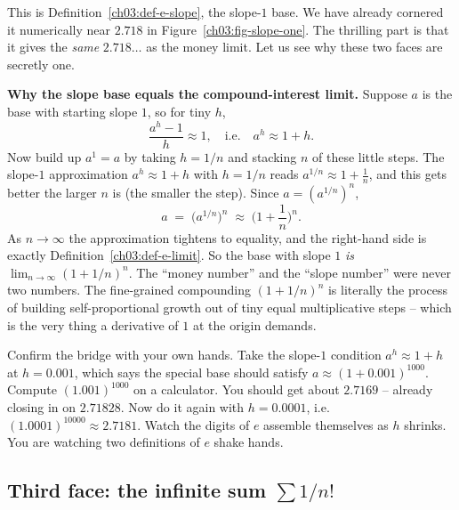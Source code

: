 This is Definition~\ref{ch03:def-e-slope}, the slope-$1$ base. We have already cornered it numerically near $2.718$ in Figure~\ref{ch03:fig-slope-one}. The thrilling part is that it gives the \emph{same} $2.718\ldots$ as the money limit. Let us see why these two faces are secretly one.

\begin{whybox}
\textbf{Why the slope base equals the compound-interest limit.} Suppose $a$ is the base with starting slope $1$, so for tiny $h$,
\[
\frac{a^{h}-1}{h}\approx 1, \quad\text{i.e.}\quad a^{h}\approx 1+h .
\]
Now build up $a^1=a$ by taking $h=1/n$ and stacking $n$ of these little steps. The slope-$1$ approximation $a^{h}\approx 1+h$ with $h=1/n$ reads $a^{1/n}\approx 1+\tfrac1n$, and this gets better the larger $n$ is (the smaller the step). Since $a = (a^{1/n})^n$,
\[
a \;=\; \big(a^{1/n}\big)^{n} \;\approx\; \Big(1+\frac1n\Big)^{n}.
\]
As $n\to\infty$ the approximation tightens to equality, and the right-hand side is exactly Definition~\ref{ch03:def-e-limit}. So the base with slope $1$ \emph{is} $\lim_{n\to\infty}(1+1/n)^n$. The ``money number'' and the ``slope number'' were never two numbers. The fine-grained compounding $(1+1/n)^n$ is literally the process of building self-proportional growth out of tiny equal multiplicative steps -- which is the very thing a derivative of $1$ at the origin demands.
\end{whybox}

\begin{labbox}
Confirm the bridge with your own hands. Take the slope-$1$ condition $a^h\approx 1+h$ at $h=0.001$, which says the special base should satisfy $a \approx (1+0.001)^{1000}$. Compute $(1.001)^{1000}$ on a calculator. You should get about $2.7169$ -- already closing in on $2.71828$. Now do it again with $h=0.0001$, i.e. $(1.0001)^{10000}\approx 2.7181$. Watch the digits of $e$ assemble themselves as $h$ shrinks. You are watching two definitions of $e$ shake hands.
\end{labbox}

\subsection{Third face: the infinite sum $\sum 1/n!$}

